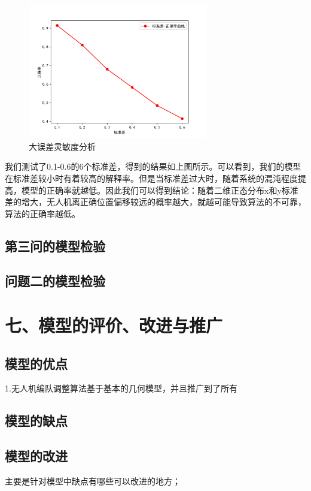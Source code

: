 \documentclass{my_paper}
\begin{document}
\begin{figure}[H]
    \centering
    \includegraphics[width=0.7\textwidth]{check22}
    \caption{大误差灵敏度分析} 
\end{figure}

我们测试了0.1-0.6的6个标准差，得到的结果如上图所示。可以看到，我们的模型在标准差较小时有着较高的解释率。但是当标准差过大时，随着系统的混沌程度提高，模型的正确率就越低。因此我们可以得到结论：随着二维正态分布x和y标准差的增大，无人机离正确位置偏移较远的概率越大，就越可能导致算法的不可靠，算法的正确率越低。

\subsection{第三问的模型检验}
\subsection{问题二的模型检验}

\section{七、模型的评价、改进与推广}
\subsection{模型的优点}
1.无人机编队调整算法基于基本的几何模型，并且推广到了所有
\subsection{模型的缺点}

\subsection{模型的改进}
主要是针对模型中缺点有哪些可以改进的地方\cite{risken1996fokker}；
\end{document}
